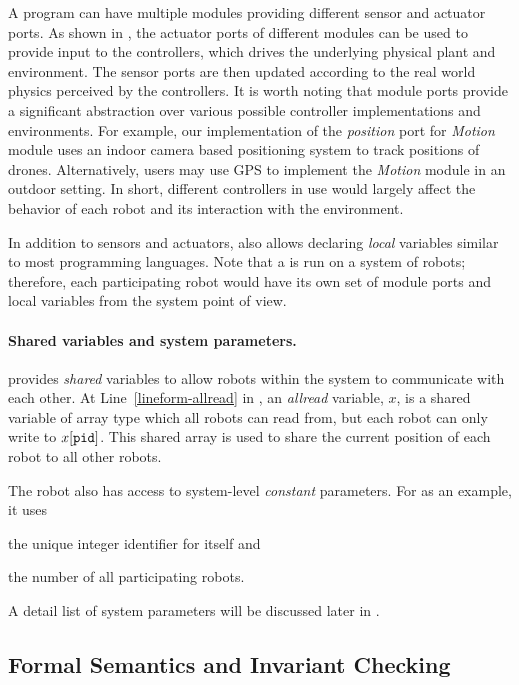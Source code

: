 A \lgname program can have multiple modules providing different sensor and actuator ports.
As shown in , the actuator ports of different modules can be used to provide input to the controllers,
which drives the underlying physical plant and environment.
The sensor ports are then updated according to the real world physics perceived by the controllers.
It is worth noting that module ports provide a significant abstraction over various possible controller implementations and environments.
For example, our implementation of the \emph{position} port for \emph{Motion} module uses an indoor camera based positioning system
to track positions of drones.
Alternatively, users may use GPS to implement the \emph{Motion} module in an outdoor setting.
In short, different controllers in use would largely affect the behavior of each robot and its interaction with the environment.

In addition to sensors and actuators, \lgname also allows declaring \emph{local} variables similar to most programming languages.
Note that a \lgname is run on a system of robots;
therefore, each participating robot would have its own set of module ports and local variables from the system point of view.


\paragraph{Shared variables and system parameters.}
\lgname provides \emph{shared} variables to allow robots within the system to communicate with each other.
At Line~\ref{lineform-allread} in , an \emph{allread} variable, $x$, is a shared variable of array type which all robots can read from,
but each robot \myuin can only write to $x[\texttt{pid}]$.
This shared array is used to share the current position of each robot to all other robots.

The robot also has access to system-level \emph{constant} parameters.
For \LineForm as an example, it uses
\begin{inparaenum}[(a)]
    \item the unique integer identifier \myuin for itself and
    \item the number \NMAX of all participating robots.
\end{inparaenum}
A detail list of system parameters will be discussed later in .


\subsection{Formal Semantics and Invariant Checking}

